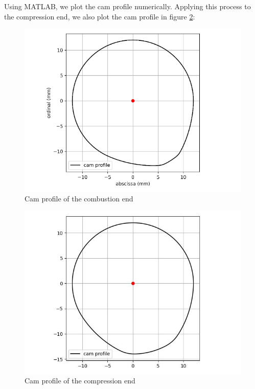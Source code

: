 Using MATLAB\textup{\textregistered}, we plot the cam profile numerically. Applying this process to the compression end, we also plot the cam profile in figure \ref{fig:28}:
\begin{figure}[h]
	\centering
	\includegraphics[width=0.6\linewidth]{27}
	\caption{Cam profile of the combustion end}
	\label{fig:27}
\end{figure}
\begin{figure}[h]
	\centering
	\includegraphics[width=0.6\linewidth]{28}
	\caption{Cam profile of the compression end}
	\label{fig:28}
\end{figure}